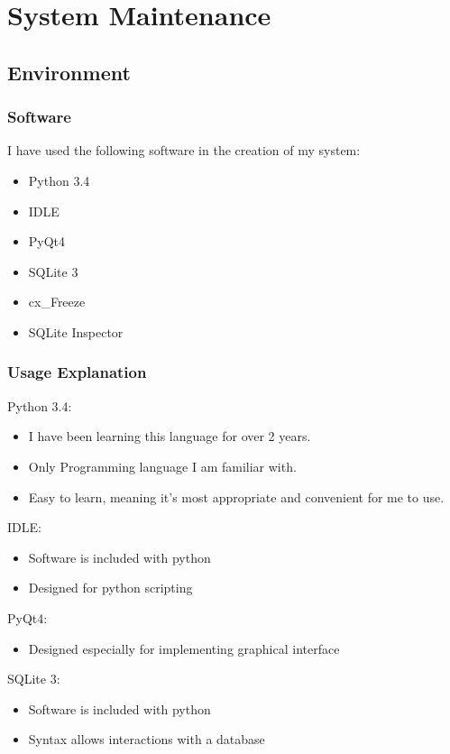 \chapter{System Maintenance}

\section{Environment}

\subsection{Software}

I have used the following software in the creation of my system:

\begin{itemize}
    \item Python 3.4
    \item IDLE
    \item PyQt4
    \item SQLite 3
    \item cx\_Freeze
    \item SQLite Inspector
\end{itemize}

\subsection{Usage Explanation}

Python 3.4:
\begin{itemize}
    \item I have been learning this language for over 2 years.
    \item Only Programming language I am familiar with.
    \item Easy to learn, meaning it's most appropriate and convenient for me to use.
\end{itemize}


IDLE:
\begin{itemize}
    \item Software is included with python
    \item Designed for python scripting
\end{itemize}


PyQt4:
\begin{itemize}
    \item Designed especially for implementing graphical interface
\end{itemize}


SQLite 3:
\begin{itemize}
    \item Software is included with python	
    \item Syntax allows interactions with a database
\end{itemize}


